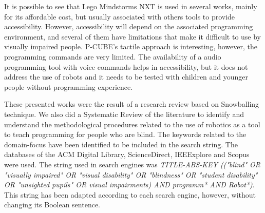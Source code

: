 It is possible to see that Lego Mindstorms NXT is used in several works, mainly for its affordable cost, but usually associated with others tools to provide accessibility. However, accessibility will depend on the associated programming environment, and several of them have limitations that make it difficult to use by visually impaired people. P-CUBE's tactile approach is interesting, however, the programming commands are very limited.  The availability of a audio programming tool with voice commands helps in accessibility, but it does not address the use of robots and it needs to be tested with children and younger people without programming experience.

These presented works were the result of a research review based on Snowballing technique. We also did a Systematic Review of the literature to identify and understand the methodological procedures related to the use of robotics as a tool to teach programming for people who are blind. The keywords related to the domain-focus have been identified to be included in the search string. The databases of the ACM Digital Library, ScienceDirect, IEEExplore and Scopus were used. The string used in search engines  was \textit{TITLE-ABS-KEY (("blind" OR "visually impaired" OR "visual disability" OR "blindness" OR "student disability" OR "unsighted pupils" OR {visual impairments}) AND programm* AND Robot*)}. This string has been adapted according to each search engine, however, without changing its Boolean sentence.

